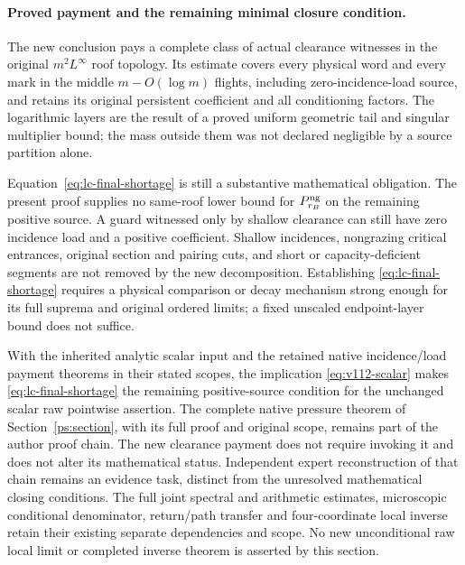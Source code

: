 \paragraph{Proved payment and the remaining minimal closure condition.}
The new conclusion pays a complete class of actual clearance witnesses
in the original $m^2L^\infty$ roof topology.  Its estimate covers every
physical word and every mark in the middle $m-O(\log m)$ flights,
including zero-incidence-load source, and retains its original
persistent coefficient and all conditioning factors.  The logarithmic
layers are the result of a proved uniform geometric tail and singular
multiplier bound; the mass outside them was not declared negligible by
a source partition alone.

Equation~\eqref{eq:lc-final-shortage} is still a substantive mathematical
obligation.  The present proof supplies no same-roof lower bound for
$P_{r_B}^{\rm ng}$ on the remaining positive source.  A guard witnessed
only by shallow clearance can still have zero incidence load and a
positive coefficient.  Shallow incidences, nongrazing critical entrances,
original section and pairing cuts, and short or capacity-deficient
segments are not removed by the new decomposition.  Establishing
\eqref{eq:lc-final-shortage} requires a physical comparison or decay
mechanism strong enough for its full suprema and original ordered
limits; a fixed unscaled endpoint-layer bound does not suffice.

With the inherited analytic scalar input and the retained native
incidence/load payment theorems in their stated scopes, the implication
\eqref{eq:v112-scalar} makes \eqref{eq:lc-final-shortage} the remaining
positive-source condition for the unchanged scalar raw pointwise
assertion.  The complete native pressure theorem of
Section~\ref{ps:section}, with its full proof and original scope,
remains part of the author proof chain.  The new clearance payment
does not require invoking it and does not alter its mathematical status.
Independent expert reconstruction of that chain remains an evidence
task, distinct from the unresolved mathematical closing conditions.
The full joint spectral and arithmetic estimates, microscopic
conditional denominator, return/path transfer and four-coordinate
local inverse retain their existing separate dependencies and scope.
No new unconditional raw local limit or completed inverse theorem is
asserted by this section.
